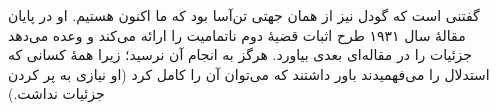 \documentclass[../../../include/open-logic-section]{subfiles}
\begin{document}
\begin{digress}
گفتنی است که گودل نیز از همان جهتی تن‌آسا بود که ما اکنون هستیم. او در
پایان مقالهٔ سال ۱۹۳۱ طرح اثبات قضیهٔ دوم ناتمامیت را ارائه می‌کند و
وعده می‌دهد جزئیات را در مقاله‌ای بعدی بیاورد. هرگز به انجام آن نرسید؛
زیرا همهٔ کسانی که استدلال را می‌فهمیدند باور داشتند که می‌توان آن را
کامل کرد (او نیازی به پر کردن جزئیات نداشت.)
\end{digress}
\end{document}
